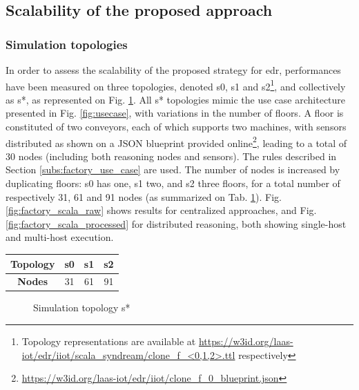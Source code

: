 \documentclass{iosart2c}
\begin{document}
\subsection{Scalability of the proposed approach}
\label{subs:factory_scalability}
\subsubsection{Simulation topologies}

In order to assess the scalability of the proposed strategy for \gls{edr}, performances have been measured on three topologies, denoted s0, s1 and s2\footnote{Topology representations are available at \url{https://w3id.org/laas-iot/edr/iiot/scala_syndream/clone_f_<0,1,2>.ttl} respectively}, and collectively as s*, as represented on Fig. \ref{fig:factory_scala_topologies}. 
All s* topologies mimic the use case architecture presented in Fig. \ref{fig:usecase}, with variations in the number of floors.
A floor is constituted of two conveyors, each of which supports two machines, with sensors distributed as shown on a JSON blueprint provided online\footnote{\url{https://w3id.org/laas-iot/edr/iiot/clone_f_0_blueprint.json}}, leading to a total of 30 nodes (including both reasoning nodes and sensors).
The rules described in Section \textsection \ref{subs:factory_use_case} are used.
The number of nodes is increased by duplicating floors: s0 has one, s1 two, and s2 three floors, for a total number of respectively 31, 61 and 91 nodes (as summarized on Tab. \ref{tab:scalability_factory_size}).
Fig. \ref{fig:factory_scala_raw} shows results for centralized approaches, and Fig. \ref{fig:factory_scala_processed} for distributed reasoning, both showing single-host and multi-host execution.

\begin{table}
	\centering
	\label{tab:scalability_factory_size}
	\begin{tabular}{|c|c|c|c|}
		\hline 
		\textbf{Topology} 	& s0 & s1 & s2 \\ \hline
		\textbf{Nodes} 		& 31 & 61 & 91 \\ \hline
	\end{tabular}
\end{table}

\begin{figure}
	\centering
	\caption{Simulation topology s*}
	\label{fig:factory_scala_topologies}
	\scalebox{0.75}{
		
	}
\end{figure}
\end{document}
